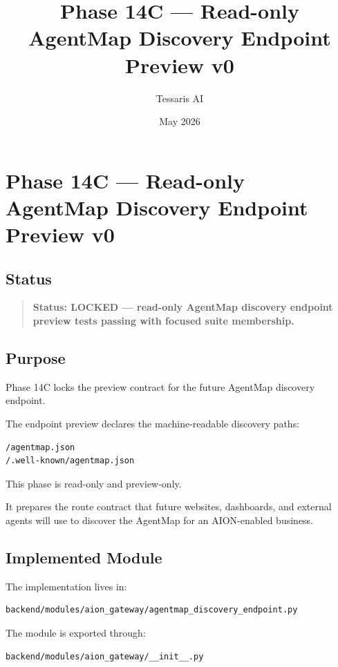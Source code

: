\documentclass[11pt]{article}
\title{Phase 14C --- Read-only AgentMap Discovery Endpoint Preview v0}
\author{Tessaris AI}
\date{May 2026}
\begin{document}
\maketitle

\section{Phase 14C --- Read-only AgentMap Discovery Endpoint Preview v0}
\label{sec:phase14c-agentmap-discovery-endpoint-preview}

\subsection{Status}

\begin{quote}
\textbf{Status: LOCKED --- read-only AgentMap discovery endpoint preview tests passing with focused suite membership.}
\end{quote}

\subsection{Purpose}

Phase 14C locks the preview contract for the future AgentMap discovery endpoint.

The endpoint preview declares the machine-readable discovery paths:

\begin{verbatim}
/agentmap.json
/.well-known/agentmap.json
\end{verbatim}

This phase is read-only and preview-only.

It prepares the route contract that future websites, dashboards, and external agents will use to discover the AgentMap for an AION-enabled business.

\subsection{Implemented Module}

The implementation lives in:

\begin{verbatim}
backend/modules/aion_gateway/agentmap_discovery_endpoint.py
\end{verbatim}

The module is exported through:

\begin{verbatim}
backend/modules/aion_gateway/__init__.py
\end{verbatim}
\end{document}
